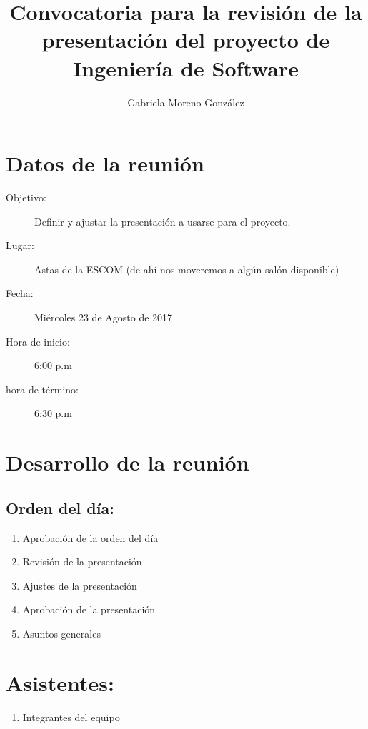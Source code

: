 \documentclass[12pt]{article}
\title{Convocatoria para la revisión de la presentación del proyecto de Ingeniería de Software}
\author{Gabriela Moreno González}
\begin{document}
\maketitle
\tableofcontents

\section{Datos de la reunión}
\begin{description}
	\item[Objetivo:] Definir y ajustar la presentación a usarse para el proyecto.
	\item[Lugar:] Astas de la ESCOM (de ahí nos moveremos a algún salón disponible)
	\item[Fecha:] Miércoles 23 de Agosto de 2017
	\item[Hora de inicio:] 6:00 p.m
	\item[hora de término:] 6:30 p.m
\end{description}

\section{Desarrollo de la reunión}

\subsection{Orden del día:}
\begin{enumerate}
 	\item Aprobación de la orden del día
	\item Revisión de la presentación
	\item Ajustes de la presentación
	\item Aprobación de la presentación
	\item Asuntos generales
\end{enumerate}

\section{Asistentes:}
\begin{enumerate}
 	 \item  Integrantes del equipo
\end{enumerate}
\end{document}
